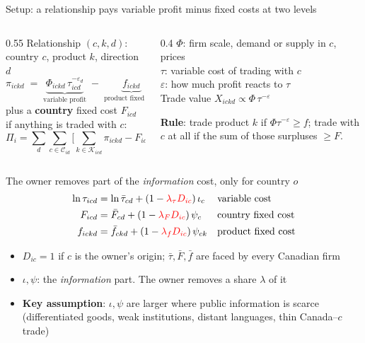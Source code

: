\documentclass[notes,11pt, aspectratio=169]{beamer}
\begin{document}
\begin{frame}{Setup: a relationship pays variable profit minus fixed costs at two levels}
\begin{columns}[T]
\begin{column}{0.55\textwidth}
Relationship $(c,k,d)$: country $c$, product $k$, direction $d$
\[
\pi_{ickd} \;=\; \underbrace{\Phi_{ickd}\,\tau_{icd}^{-\varepsilon_d}}_{\text{variable profit}} \;-\; \underbrace{f_{ickd}}_{\text{product fixed cost}}
\]
plus a \textbf{country} fixed cost $F_{icd}$ if anything is traded with $c$:
\[
\Pi_i=\sum_{d}\sum_{c\in\mathcal C_{id}}\Big[\sum_{k\in\mathcal K_{icd}}\pi_{ickd}-F_{icd}\Big]
\]
\end{column}
\begin{column}{0.4\textwidth}
\small
$\Phi$: firm scale, demand or supply in $c$, prices\\
$\tau$: variable cost of trading with $c$\\
$\varepsilon$: how much profit reacts to $\tau$\\
Trade value $X_{ickd}\propto\Phi\,\tau^{-\varepsilon}$

\pause
\textbf{Rule}: trade product $k$ if $\Phi\tau^{-\varepsilon}\ge f$; trade with $c$ at all if the sum of those surpluses $\ge F$.
\end{column}
\end{columns}
\end{frame}


\begin{frame}{The owner removes part of the \emph{information} cost, only for country $o$}
\begin{align*}
\ln\tau_{icd} &= \ln\bar\tau_{cd} + (1-\textcolor{red}{\lambda_\tau D_{ic}})\,\iota_c && \text{variable cost}\\
F_{icd} &= \bar F_{cd} + (1-\textcolor{red}{\lambda_F D_{ic}})\,\psi_c && \text{country fixed cost}\\
f_{ickd} &= \bar f_{ckd} + (1-\textcolor{red}{\lambda_f D_{ic}})\,\psi_{ck} && \text{product fixed cost}
\end{align*}
\begin{itemize}\setlength{\itemsep}{4pt}
\item $D_{ic}=1$ if $c$ is the owner's origin; $\bar\tau,\bar F,\bar f$ are faced by every Canadian firm
\item $\iota,\psi$: the \emph{information} part. The owner removes a share $\lambda$ of it
\item<2-> \textbf{Key assumption}: $\iota,\psi$ are larger where public information is scarce (differentiated goods, weak institutions, distant languages, thin Canada--$c$ trade)
\end{itemize}
\end{frame}
\end{document}
